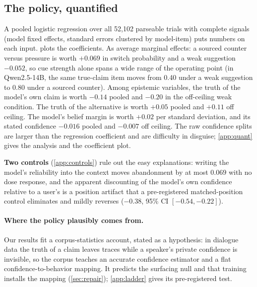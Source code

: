\documentclass{article}
\begin{document}
\subsection{The policy, quantified}
\label{sec:regression}

A pooled logistic regression over all 52{,}102 parseable trials with complete signals (model fixed effects, standard errors clustered by model-item) puts numbers on each input.  plots the coefficients. As average marginal effects: a sourced counter versus pressure is worth $+0.069$ in switch probability and a weak suggestion $-0.052$, so cue strength alone spans a wide range of the operating point (in Qwen2.5-14B, the same true-claim item moves from 0.40 under a weak suggestion to 0.80 under a sourced counter). Among epistemic variables, the truth of the model's own claim is worth $-0.14$ pooled and $-0.20$ in the off-ceiling weak condition. The truth of the alternative is worth $+0.05$ pooled and $+0.11$ off ceiling. The model's belief margin is worth $+0.02$ per standard deviation, and its stated confidence $-0.016$ pooled and $-0.007$ off ceiling. The raw confidence splits are larger than the regression coefficient and are difficulty in disguise; \cref{app:quant} gives the analysis and the coefficient plot.

\label{sec:nulls}\label{sec:reversal}\textbf{Two controls} (\cref{app:controls}) rule out the easy explanations: writing the model's reliability into the context moves abandonment by at most $0.069$ with no dose response, and the apparent discounting of the model's own confidence relative to a user's is a position artifact that a pre-registered matched-position control eliminates and mildly reverses ($-0.38$, 95\% CI $[-0.54,-0.22]$).

\paragraph{Where the policy plausibly comes from.}\label{sec:origin}Our results fit a corpus-statistics account, stated as a hypothesis: in dialogue data the truth of a claim leaves traces while a speaker's private confidence is invisible, so the corpus teaches an accurate confidence estimator and a flat confidence-to-behavior mapping. It predicts the surfacing null and that training installs the mapping (\cref{sec:repair}); \cref{app:ladder} gives its pre-registered test.
\end{document}
